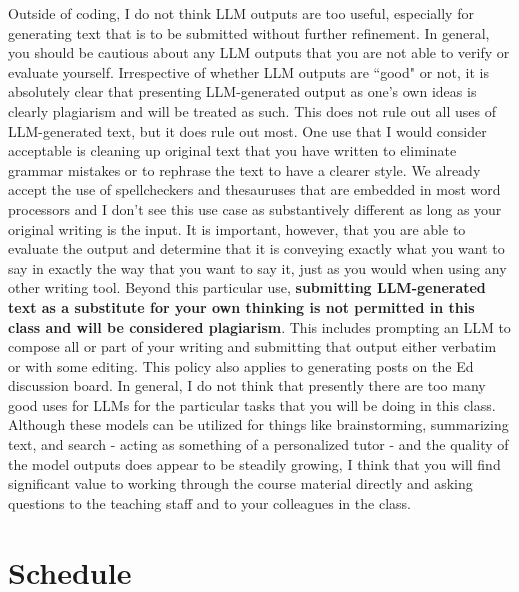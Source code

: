 \documentclass[11pt, article, oneside]{memoir}
\theoremstyle{Assumption}
\begin{document}
\newline\newline
Outside of coding, I do not think LLM outputs are too useful, especially for generating text that is to be submitted without further refinement. In general, you should be cautious about any LLM outputs that you are not able to verify or evaluate yourself. 
\newline\newline
Irrespective of whether LLM outputs are ``good" or not, it is absolutely clear that presenting LLM-generated output as one's own ideas is clearly plagiarism and will be treated as such. This does not rule out all uses of LLM-generated text, but it does rule out most. One use that I would consider acceptable is cleaning up original text that you have written to eliminate grammar mistakes or to rephrase the text to have a clearer style. We already accept the use of spellcheckers and thesauruses that are embedded in most word processors and I don't see this use case as substantively different as long as your original writing is the input. It is important, however, that you are able to evaluate the output and determine that it is conveying exactly what you want to say in exactly the way that you want to say it, just as you would when using any other writing tool.
\newline\newline
Beyond this particular use, \textbf{submitting LLM-generated text as a substitute for your own thinking is not permitted in this class and will be considered plagiarism}. This includes prompting an LLM to compose all or part of your writing and submitting that output either verbatim or with some editing. This policy also applies to generating posts on the Ed discussion board. 
\newline\newline
In general, I do not think that presently there are too many good uses for LLMs for the particular tasks that you will be doing in this class. Although these models can be utilized for things like brainstorming, summarizing text, and search - acting as something of a personalized tutor - and the quality of the model outputs does appear to be steadily growing, I think that you will find significant value to working through the course material directly and asking questions to the teaching staff and to your colleagues in the class.

\section*{Schedule}
\end{document}
